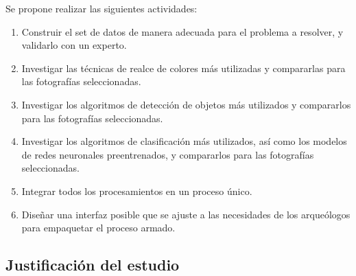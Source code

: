 Se propone realizar las siguientes actividades:
\begin{enumerate}
    \item Construir el set de datos de manera adecuada para el problema a resolver, y validarlo con un experto.
    \item Investigar las técnicas de realce de colores más utilizadas y compararlas para las fotografías seleccionadas.
    \item Investigar los algoritmos de detección de objetos más utilizados y compararlos para las fotografías seleccionadas.
    \item Investigar los algoritmos de clasificación más utilizados, así como los modelos de redes neuronales preentrenados, y compararlos para las fotografías seleccionadas.
    \item Integrar todos los procesamientos en un proceso único.
    \item Diseñar una interfaz posible que se ajuste a las necesidades de los arqueólogos para empaquetar el proceso armado.
\end{enumerate}

\subsection{Justificación del estudio}

